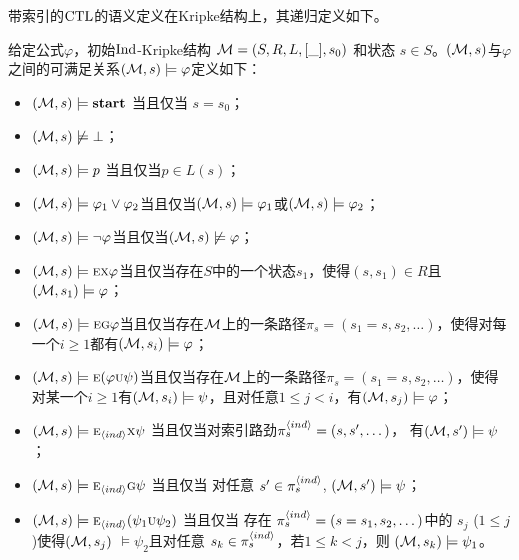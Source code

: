 带索引的$\textrm{CTL}$的语义定义在Kripke结构上，其递归定义如下。
\begin{definition}\label{def:ctl:semantic}
	给定公式$\varphi$，初始$\textrm{Ind}$-Kripke结构 ${\cal M}=(S,R,L,[\_],s_0)$ 和状态 $s\in S$。$({\cal M},s)$与$\varphi$之间的可满足关系$({\cal M},s)\models \varphi$定义如下：
	\begin{itemize}
		\item $({\cal M},s) \models \textbf{start}$ 当且仅当 $s=s_0$；
		\item $({\cal M},s) \not \models \bot$；%
		\item $({\cal M},s)\models p$ 当且仅当$p\in L(s)$；
		\item $({\cal M},s) \models \varphi_1 \vee \varphi_2$当且仅当$({\cal M},s)\models \varphi_1$或$({\cal M},s)\models \varphi_2$；
		\item $({\cal M},s)\models \neg \varphi$当且仅当$({\cal M},s)\not \models \varphi$；
		\item $({\cal M},s)\models \textsc{e}\textsc{x} \varphi$当且仅当存在$S$中的一个状态$s_1$，使得$(s,s_1)\in R$且$({\cal M},s_1)\models \varphi$；
		\item $({\cal M},s)\models \textsc{e}\textsc{g}\varphi$当且仅当存在${\cal M}$上的一条路径$\pi_s=(s_1=s, s_2,\dots)$，使得对每一个$i\ge 1$都有$({\cal M},s_i)\models \varphi$；
		\item $({\cal M},s)\models \textsc{e}(\varphi \textsc{u} \psi)$当且仅当存在${\cal M}$上的一条路径$\pi_s=(s_1=s, s_2,\dots)$，使得对某一个$i\ge 1$有$({\cal M},s_i)\models \psi$，且对任意$1\leq j < i$，有$({\cal M},s_j)\models \varphi$；
		\item $({\cal M},s)\models \textsc{e}_{{\langle{ind}\rangle}} \textsc{x} \psi$ 当且仅当对索引路劲$\pi_{s}^{{\langle{ind}\rangle}}=(s,s',\dots)$， 有$({\cal M}, s')\models \psi$；
		\item $({\cal M},s)\models \textsc{e}_{{\langle{ind}\rangle}}\textsc{g}\psi$ 当且仅当
		对任意 $s' \in  \pi_{s}^{{\langle{ind}\rangle}}$, %
		$({\cal M},s') \models \psi$；
		\item $({\cal M},s)\models \textsc{e}_{{\langle{ind}\rangle}}(\psi_1\textsc{u}\psi_2)$ 当且仅当
		存在 $ \pi_{s}^{{\langle{ind}\rangle}} = (s=s_1, s_2, \dots)$中的 $s_j$ ($1\leq j$)使得$({\cal M},s_j)$ $\models \psi_2$且对任意 $s_k \in \pi_{s}^{{\langle{ind}\rangle}}$，若$1\leq k < j$，则 $({\cal M},s_k) \models \psi_1$。
	\end{itemize}
\end{definition}



